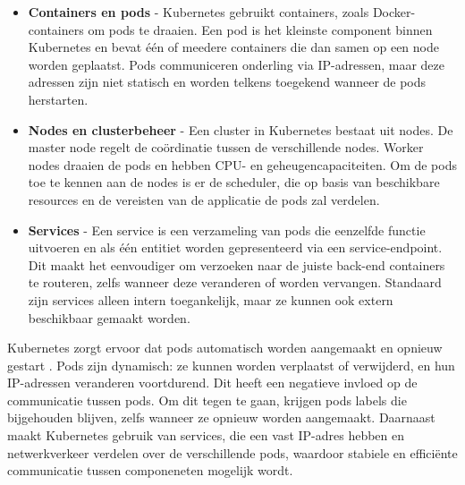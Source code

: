 \begin{itemize}
	\item \textbf{Containers en pods} - Kubernetes gebruikt containers, zoals Docker-containers om pods te draaien. Een pod is het kleinste component binnen Kubernetes en bevat één of meedere containers die dan samen op een node worden geplaatst. Pods communiceren onderling via IP-adressen, maar deze adressen zijn niet statisch en worden telkens toegekend wanneer de pods herstarten.
	\item \textbf{Nodes en clusterbeheer} - Een cluster in Kubernetes bestaat uit nodes. De master node regelt de coördinatie tussen de verschillende nodes. Worker nodes draaien de pods en hebben CPU- en geheugencapaciteiten. Om de pods toe te kennen aan de nodes is er de scheduler, die op basis van beschikbare resources en de vereisten van de applicatie de pods zal verdelen.
	\item \textbf{Services} - Een service is een verzameling van pods die eenzelfde functie uitvoeren en als één entitiet worden gepresenteerd via een service-endpoint. Dit maakt het eenvoudiger om verzoeken naar de juiste back-end containers te routeren, zelfs wanneer deze veranderen of worden vervangen. Standaard zijn services alleen intern toegankelijk, maar ze kunnen ook extern beschikbaar gemaakt worden.
\end{itemize}

Kubernetes zorgt ervoor dat pods automatisch worden aangemaakt en opnieuw gestart \autocite{Vayghan2021}. Pods zijn dynamisch: ze kunnen worden verplaatst of verwijderd, en hun IP-adressen veranderen voortdurend. Dit heeft een negatieve invloed op de communicatie tussen pods. Om dit tegen te gaan, krijgen pods labels die bijgehouden blijven, zelfs wanneer ze opnieuw worden aangemaakt. Daarnaast maakt Kubernetes gebruik van services, die een vast IP-adres hebben en netwerkverkeer verdelen over de verschillende pods, waardoor stabiele en efficiënte communicatie tussen componeneten mogelijk wordt.




